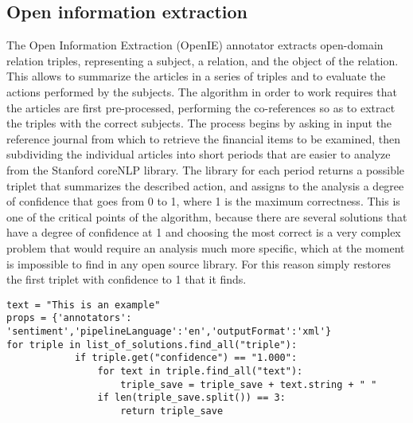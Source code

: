 \subsection{Open information extraction}
The Open Information Extraction (OpenIE) annotator extracts open-domain relation triples, representing a subject, a relation, and the object of the relation. This allows to summarize the articles in a series of triples and to evaluate the actions performed by the subjects. 
The algorithm in order to work requires that the articles are first pre-processed, performing the co-references so as to extract the triples with the correct subjects. 
The process begins by asking in input the reference journal from which to retrieve the financial items to be examined, then subdividing the individual articles into short periods that are easier to analyze from the Stanford coreNLP library. The library for each period returns a possible triplet that summarizes the described action, and assigns to the analysis a degree of confidence that goes from 0 to 1, where 1 is the maximum correctness. This is one of the critical points of the algorithm, because there are several solutions that have a degree of confidence at 1 and choosing the most correct is a very complex problem that would require an analysis much more specific, which at the moment is impossible to find in any open source library. For this reason simply restores the first triplet with confidence to 1 that it finds.
\begin{verbatim}
text = "This is an example"
props = {'annotators': 'sentiment','pipelineLanguage':'en','outputFormat':'xml'}
for triple in list_of_solutions.find_all("triple"):
            if triple.get("confidence") == "1.000":
                for text in triple.find_all("text"):
                    triple_save = triple_save + text.string + " "
                if len(triple_save.split()) == 3:
                    return triple_save
\end{verbatim}

